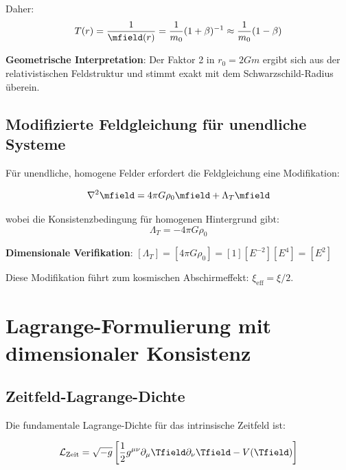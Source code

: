	Daher:
	\begin{equation}
		T(r) = \frac{1}{\mfield(r)} = \frac{1}{m_0}(1 + \beta)^{-1} \approx \frac{1}{m_0}(1 - \beta)
		\label{eq:zeitfeld_loesung}
	\end{equation}
	
	\textbf{Geometrische Interpretation}: Der Faktor 2 in $r_0 = 2Gm$ ergibt sich aus der relativistischen Feldstruktur und stimmt exakt mit dem Schwarzschild-Radius überein.
	
	\subsection{Modifizierte Feldgleichung für unendliche Systeme}
	\label{subsec:unendliche_systeme}
	
	Für unendliche, homogene Felder erfordert die Feldgleichung eine Modifikation:
	
	\begin{equation}
		\nabla^2 \mfield = 4\pi G \rho_0 \mfield + \Lambda_T \mfield
		\label{eq:modifizierte_feldgleichung}
	\end{equation}
	
	wobei die Konsistenzbedingung für homogenen Hintergrund gibt:
	\begin{equation}
		\Lambda_T = -4\pi G \rho_0
		\label{eq:lambda_t_definition}
	\end{equation}
	
	\textbf{Dimensionale Verifikation}: $[\Lambda_T] = [4\pi G \rho_0] = [1][E^{-2}][E^4] = [E^2]$ \checkmark
	
	Diese Modifikation führt zum kosmischen Abschirmeffekt: $\xi_{\text{eff}} = \xi/2$.
	
	\section{Lagrange-Formulierung mit dimensionaler Konsistenz}
	\label{sec:lagrange_formulierung}
	
	\subsection{Zeitfeld-Lagrange-Dichte}
	\label{subsec:zeitfeld_lagrange}
	
	Die fundamentale Lagrange-Dichte für das intrinsische Zeitfeld ist:
	
	\begin{equation}
		\mathcal{L}_{\text{Zeit}} = \sqrt{-g} \left[\frac{1}{2} g^{\mu\nu} \partial_\mu \Tfield \partial_\nu \Tfield - V(\Tfield)\right]
		\label{eq:zeitfeld_lagrange}
	\end{equation}
	
